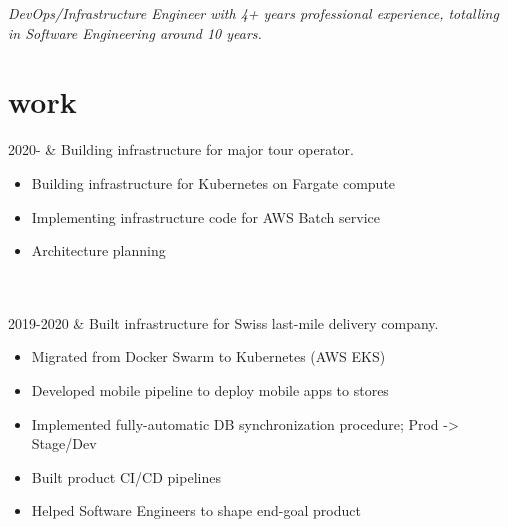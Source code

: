 \documentclass[changecolor={47, 79, 79}]{cv-roald}
\begin{document}
\pagestyle{empty} %


\textit{DevOps/Infrastructure Engineer with 4+ years professional experience, totalling in Software Engineering around 10 years.}

\section*{work}
\begin{tabularcv}
2020-   &   
                \newline Building infrastructure for major tour operator.
                \begin{itemize}
                  \item Building infrastructure for Kubernetes on Fargate compute
                  \item Implementing infrastructure code for AWS Batch service
                  \item Architecture planning
                \end{itemize}
                \\
                \\
                
2019-2020   &   
                \newline Built infrastructure for Swiss last-mile delivery company.
                \begin{itemize}
                  \item Migrated from Docker Swarm to Kubernetes (AWS EKS)
                  \item Developed mobile pipeline to deploy mobile apps to stores
                  \item Implemented fully-automatic DB synchronization procedure; Prod -> Stage/Dev
                  \item Built product CI/CD pipelines
                  \item Helped Software Engineers to shape end-goal product
                \end{itemize} 
                \\
                \\
                

\end{tabularcv}
\end{document}
